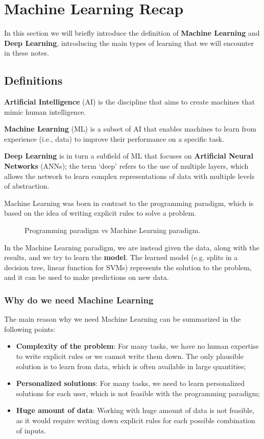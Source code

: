 \section{Machine Learning Recap}
In this section we will briefly introduce the definition of \textbf{Machine Learning} and \textbf{Deep Learning},
introducing the main types of learning that we will encounter in these notes.

\subsection{Definitions}
\textbf{Artificial Intelligence} (AI) is the discipline that aims to create machines that mimic human intelligence.

\textbf{Machine Learning} (ML) is a subset of AI that enables machines to learn from experience (i.e., data) to improve their performance on a specific task.

\textbf{Deep Learning} is in turn a subfield of ML that focuses on \textbf{Artificial Neural Networks} (ANNs); the term `deep' refers to the use of multiple layers,
which allows the network to learn complex representations of data with multiple levels of abstraction.

Machine Learning was born in contrast to the programming paradigm, which is based on the idea of writing explicit rules to solve a problem.
\begin{figure}[H]
    \centering
    \scalebox{0.8}{
        
    }
    \caption{Programming paradigm vs Machine Learning paradigm.}
    \label{fig:programming_paradigm}
\end{figure}
In the Machine Learning paradigm, we are instead given the data, along with the results, and we try to learn the \textbf{model}. The learned model
(e.g. splits in a decision tree, linear function for SVMs) represents the solution to the problem, and it can be used to make predictions on new data.

\subsubsection{Why do we need Machine Learning}
The main reason why we need Machine Learning can be summarized in the following points:
\begin{itemize}
    \item \textbf{Complexity of the problem}: For many tasks, we have no human expertise to write explicit rules or
    we cannot write them down. The only plausible solution is to learn from data, which is often available in large quantities;
    \item \textbf{Personalized solutions}: For many tasks, we need to learn personalized solutions for each user, which is not feasible with the programming paradigm;
    \item \textbf{Huge amount of data}: Working with huge amount of data is not feasible, as it would require writing down explicit rules for each possible combination of inputs.
\end{itemize}

